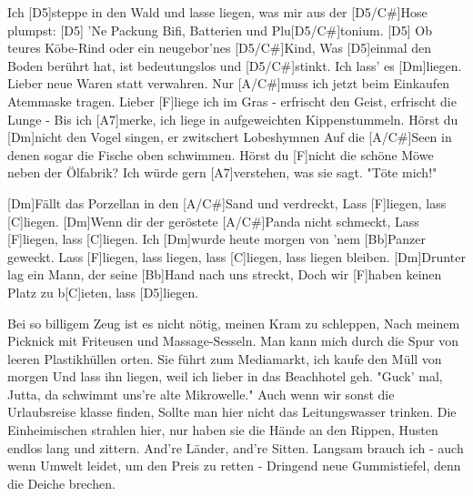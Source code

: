 


\vspace*{-2mm} %
\begin{guitar}
	Ich [D5]steppe in den Wald und lasse liegen, was mir aus der [D5/C#]Hose plumpst:
	[D5] 'Ne Packung Bifi, Batterien und Plu[D5/C#]tonium.
	[D5] Ob teures Kōbe-Rind oder ein neugebor'nes [D5/C#]Kind,
	Was [D5]einmal den Boden berührt hat, ist bedeutungslos und [D5/C#]stinkt.
	Ich lass' es [Dm]liegen. Lieber neue Waren statt verwahren.
	Nur [A/C#]muss ich jetzt beim Einkaufen Atemmaske tragen.
	Lieber [F]liege ich im Gras - erfrischt den Geist, erfrischt die Lunge -
	Bis ich [A7]merke, ich liege in aufgeweichten Kippenstummeln.
	Hörst du [Dm]nicht den Vogel singen, er zwitschert Lobeshymnen
	Auf die [A/C#]Seen in denen sogar die Fische oben schwimmen.
	Hörst du [F]nicht die schöne Möwe neben der Ölfabrik?
	Ich würde gern [A7]verstehen, was sie sagt. "Töte mich!"
	
	[Dm]Fällt das Porzellan in den [A/C#]Sand und verdreckt,
	Lass [F]liegen, lass [C]liegen.
	[Dm]Wenn dir der geröstete [A/C#]Panda nicht schmeckt,
	Lass [F]liegen, lass [C]liegen.
	Ich [Dm]wurde heute morgen von 'nem [Bb]Panzer geweckt.
	Lass [F]liegen, lass liegen, lass [C]liegen, lass liegen bleiben.
	[Dm]Drunter lag ein Mann, der seine [Bb]Hand nach uns streckt,
	Doch wir [F]haben keinen Platz zu b[C]ieten, lass [D5]liegen.
	
	Bei so billigem Zeug ist es nicht nötig, meinen Kram zu schleppen,
	Nach meinem Picknick mit Friteusen und Massage-Sesseln.
	Man kann mich durch die Spur von leeren Plastikhüllen orten.
	Sie führt zum Mediamarkt, ich kaufe den Müll von morgen
	Und lass ihn liegen, weil ich lieber in das Beachhotel geh.
	"Guck' mal, Jutta, da schwimmt uns're alte Mikrowelle."
	Auch wenn wir sonst die Urlaubsreise klasse finden,
	Sollte man hier nicht das Leitungswasser trinken.
	Die Einheimischen strahlen hier, nur haben sie die Hände an den Rippen,
	Husten endlos lang und zittern. And're Länder, and're Sitten.
	Langsam brauch ich - auch wenn Umwelt leidet, um den Preis zu retten -
	Dringend neue Gummistiefel, denn die Deiche brechen.
	

\end{guitar}
